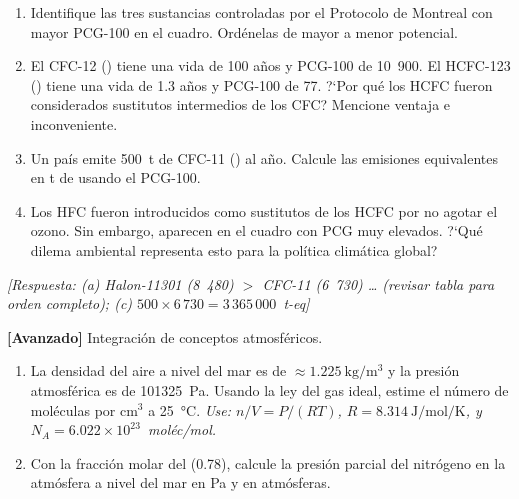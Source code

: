 \begin{bloque_ejercicios}
\begin{ejercicios}
\begin{enumerate}[label=\alph*)]
    \item Identifique las tres sustancias controladas por el
          Protocolo de Montreal con mayor PCG-100 en el cuadro.
          Ord\'enelas de mayor a menor potencial.

    \item El CFC-12 () tiene una vida de 100 a\~nos
          y PCG-100 de 10~900. El HCFC-123 ()
          tiene una vida de 1.3 a\~nos y PCG-100 de 77. ?`Por qu\'e
          los HCFC fueron considerados sustitutos intermedios
          de los CFC? Mencione ventaja e inconveniente.

    \item Un pa\'is emite \SI{500}{\tonne} de CFC-11
          () al a\~no. Calcule las emisiones equivalentes
          en \si{\tonne} de  usando el PCG-100.

    \item Los HFC fueron introducidos como sustitutos de los
          HCFC por no agotar el ozono. Sin embargo, aparecen
          en el cuadro con PCG muy elevados. ?`Qu\'e dilema
          ambiental representa esto para la pol\'itica
          clim\'atica global?
\end{enumerate}

\textit{[Respuesta:
(a) Halon-11301 (8~480) $>$ CFC-11 (6~730) \ldots
    (revisar tabla para orden completo);
(c) $500 \times 6\,730 = 3\,365\,000$~t-eq]}

\item \textbf{[Avanzado]} Integraci\'on de conceptos atmosf\'ericos.

\begin{enumerate}[label=\alph*)]
    \item La densidad del aire a nivel del mar es de
          $\approx \SI{1.225}{\kilo\gram\per\cubic\metre}$
          y la presi\'on atmosf\'erica es de \SI{101325}{\pascal}.
          Usando la ley del gas ideal, estime el n\'umero de
          mol\'eculas por cm$^3$ a \SI{25}{\celsius}.
          \textit{Use: $n/V = P/(RT)$,
          $R = \SI{8.314}{\joule\per\mole\per\kelvin}$,
          y $N_A = 6.022\times10^{23}$~mol\'ec/mol.}

    \item Con la fracci\'on molar del  (0.78), calcule
          la presi\'on parcial del nitr\'ogeno en la atm\'osfera
          a nivel del mar en Pa y en atm\'osferas.


\end{enumerate}
\end{ejercicios}
\end{bloque_ejercicios}

